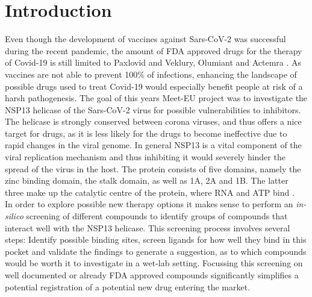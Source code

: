 \documentclass[11pt, letterpaper, titlepage]{article}
\renewcommand{\cite}{\parencite}
\begin{document}
\section{Introduction}
Even though the development of vaccines against Sars-CoV-2 was successful during the recent pandemic, the amount of FDA approved drugs for the therapy of Covid-19 is still limited to Paxlovid and Veklury, Olumiant and Actemra \cite{FDACOVID}. As vaccines are not able to prevent 100\% of infections, enhancing the landscape of possible drugs used to treat Covid-19 would especially benefit people at risk of a harsh pathogenesis. The goal of this years Meet-EU project was to investigate the \ac{NSP13} helicase of the Sars-CoV-2 virus for possible vulnerabilities to inhibitors. The helicase is strongly conserved between corona viruses, and thus offers a nice target for drugs, as it is less likely for the drugs to become ineffective due to rapid changes in the viral genome. In general \ac{NSP13} is a vital component of the viral replication mechanism and thus inhibiting it would severely hinder the spread of the virus in the host. The protein consists of five domains, namely the zinc binding domain, the stalk domain, as well as 1A, 2A and 1B. The latter three make up the catalytic centre of the protein, where RNA and ATP bind \cite{NSP13_basics}. \\
In order to explore possible new therapy options it makes sense to perform an \textit{in-silico} screening of different compounds to identify groups of compounds that interact well with the NSP13 helicase. This screening process involves several steps: Identify possible binding sites, screen ligands for how well they bind in this pocket and validate the findings to generate a suggestion, as to which compounds would be worth it to investigate in a wet-lab setting. Focussing this screening on well documented or already FDA approved compounds significantly simplifies a potential registration of a potential new drug entering the market. 
\end{document}
